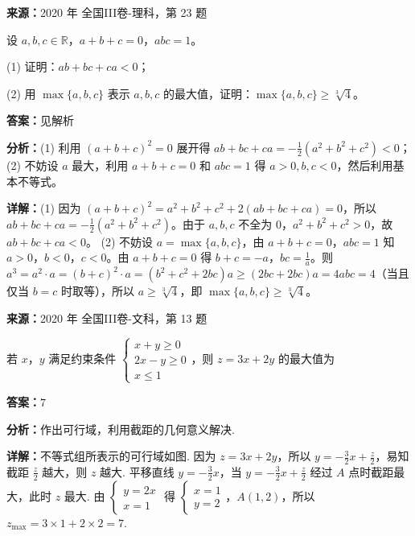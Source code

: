 \begin{question}[points=10]
\textbf{来源：}2020 年 全国III卷-理科，第 23 题\par
[选修4-5：不等式选讲]

设 $a,b,c\in\mathbb{R}$，$a+b+c=0$，$abc=1$。

(1) 证明：$ab+bc+ca<0$；

(2) 用 $\max\{a,b,c\}$ 表示 $a,b,c$ 的最大值，证明：$\max\{a,b,c\}\ge\sqrt[3]{4}$。
\begin{solution}
\textbf{答案：}见解析

\textbf{分析：}(1) 利用 $(a+b+c)^2=0$ 展开得 $ab+bc+ca=-\frac12(a^2+b^2+c^2)<0$；(2) 不妨设 $a$ 最大，利用 $a+b+c=0$ 和 $abc=1$ 得 $a>0,b,c<0$，然后利用基本不等式。

\textbf{详解：}(1) 因为 $(a+b+c)^2=a^2+b^2+c^2+2(ab+bc+ca)=0$，所以 $ab+bc+ca=-\frac12(a^2+b^2+c^2)$。由于 $a,b,c$ 不全为 $0$，$a^2+b^2+c^2>0$，故 $ab+bc+ca<0$。
(2) 不妨设 $a=\max\{a,b,c\}$，由 $a+b+c=0$，$abc=1$ 知 $a>0$，$b<0$，$c<0$。由 $a+b+c=0$ 得 $b+c=-a$，$bc=\frac1a$。则 $a^3=a^2\cdot a=(b+c)^2\cdot a=(b^2+c^2+2bc)a\ge (2bc+2bc)a=4abc=4$（当且仅当 $b=c$ 时取等），所以 $a\ge\sqrt[3]{4}$，即 $\max\{a,b,c\}\ge\sqrt[3]{4}$。
\end{solution}
\end{question}

\begin{question}[points=5]
\textbf{来源：}2020 年 全国III卷-文科，第 13 题\par
若 $x$，$y$ 满足约束条件 $\begin{cases} x+y\geq0 \\ 2x-y\geq0 \\ x\leq1 \end{cases}$，则 $z=3x+2y$ 的最大值为
\fillin[{$7$}]
\begin{solution}
\textbf{答案：}$7$

\textbf{分析：}作出可行域，利用截距的几何意义解决.

\textbf{详解：}不等式组所表示的可行域如图. 因为 $z=3x+2y$，所以 $y=-\frac{3}{2}x+\frac{z}{2}$，易知截距 $\frac{z}{2}$ 越大，则 $z$ 越大. 平移直线 $y=-\frac{3}{2}x$，当 $y=-\frac{3}{2}x+\frac{z}{2}$ 经过 $A$ 点时截距最大，此时 $z$ 最大. 由 $\begin{cases} y=2x \\ x=1 \end{cases}$ 得 $\begin{cases} x=1 \\ y=2 \end{cases}$，$A(1,2)$，所以 $z_{\max}=3\times1+2\times2=7$.
\end{solution}
\end{question}

